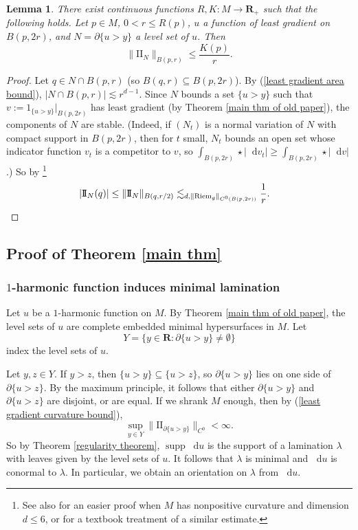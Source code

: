 \documentclass[reqno,11pt]{amsart}
\newcommand{\RR}{\mathbf{R}}
\newcommand*\dif{\mathop{}\!\mathrm{d}}
\DeclareMathOperator{\supp}{supp}
\newcommand{\Two}{\mathrm{I\!I}}
\newcommand{\Riem}{\mathrm{Riem}}
\newtheorem{lemma}[theorem]{Lemma}
\theoremstyle{definition}
\numberwithin{equation}{section}
\begin{document}
\begin{lemma}
There exist continuous functions $R, K: M \to \RR_+$ such that the following holds.
Let $p \in M$, $0 < r \leq R(p)$, $u$ a function of least gradient on $B(p, 2r)$, and $N = \partial \{u > y\}$ a level set of $u$.
Then
\begin{equation}\label{least gradient curvature bound}
\|\Two_N\|_{B(p, r)} \leq \frac{K(p)}{r}.
\end{equation}
\end{lemma}
\begin{proof}
Let $q \in N \cap B(p, r)$ (so $B(q, r) \subseteq B(p, 2r)$).
By (\ref{least gradient area bound}), $|N \cap B(p, r)| \lesssim r^{d - 1}$.
Since $N$ bounds a set $\{u > y\}$ such that $v := 1_{\{u > y\}}|_{B(p, 2r)}$ has least gradient (by Theorem \ref{main thm of old paper}), the components of $N$ are stable.
(Indeed, if $(N_t)$ is a normal variation of $N$ with compact support in $B(p, 2r)$, then for $t$ small, $N_t$ bounds an open set whose indicator function $v_t$ is a competitor to $v$, so $\int_{B(p, 2r)} \star |\dif v_t| \geq \int_{B(p, 2r)} \star |\dif v|$.)
So by \cite[pg785, Corollary 1]{Schoen81}\footnote{See also \cite[Theorem 3]{Schoen75} for an easier proof when $M$ has nonpositive curvature and dimension $d \leq 6$, or \cite[Chapter 2, \S\S5-6]{colding2011course} for a textbook treatment of a similar estimate.}
\begin{align*}
|\Two_N(q)| &\leq \|\Two_N\|_{B(q, r/2)} \lesssim_{d, \|\Riem_g\|_{C^0(B(p, 2r))}} \frac{1}{r}. \qedhere 
\end{align*}
\end{proof}

\subsection{Proof of Theorem \texorpdfstring{\ref{main thm}}{C}}
\subsubsection{\texorpdfstring{$1$-harmonic}{One-harmonic} function induces minimal lamination}
Let $u$ be a $1$-harmonic function on $M$.
By Theorem \ref{main thm of old paper}, the level sets of $u$ are complete embedded minimal hypersurfaces in $M$.
Let
$$Y = \{y \in \RR: \partial \{u > y\} \neq \emptyset\}$$
index the level sets of $u$.

Let $y, z \in Y$. If $y > z$, then $\{u > y\} \subseteq \{u > z\}$, so $\partial \{u > y\}$ lies on one side of $\partial \{u > z\}$.
By the maximum principle, it follows that either $\partial \{u > y\}$ and $\partial \{u > z\}$ are disjoint, or are equal.
If we shrank $M$ enough, then by (\ref{least gradient curvature bound}),
$$\sup_{y \in Y} \|\Two_{\partial \{u > y\}}\|_{C^0} < \infty.$$
So by Theorem \ref{regularity theorem}, $\supp \dif u$ is the support of a lamination $\lambda$ with leaves given by the level sets of $u$.
It follows that $\lambda$ is minimal and $\dif u$ is conormal to $\lambda$.
In particular, we obtain an orientation on $\lambda$ from $\dif u$.
\end{document}
